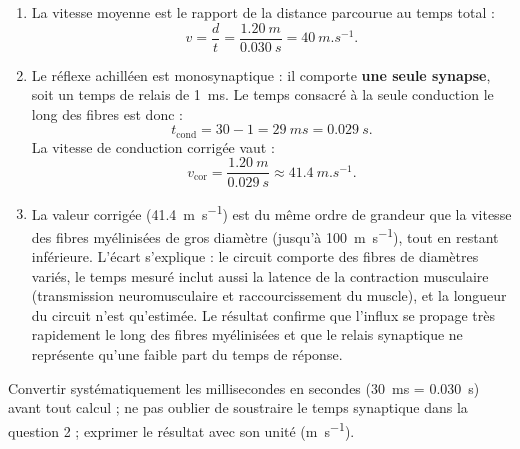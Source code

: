 \documentclass[11pt]{article}
\begin{document}
\begin{corrige}
\begin{enumerate}
\item La vitesse moyenne est le rapport de la distance parcourue au temps total :
\[ v = \frac{d}{t} = \frac{\SI{1,20}{m}}{\SI{0,030}{s}} = \SI{40}{m.s^{-1}}. \]
\item Le réflexe achilléen est monosynaptique : il comporte \textbf{une seule synapse}, soit un temps de relais de \SI{1}{ms}. Le temps consacré à la seule conduction le long des fibres est donc :
\[ t_{\text{cond}} = 30 - 1 = \SI{29}{ms} = \SI{0,029}{s}. \]
La vitesse de conduction corrigée vaut :
\[ v_{\text{cor}} = \frac{\SI{1,20}{m}}{\SI{0,029}{s}} \approx \SI{41,4}{m.s^{-1}}. \]
\item La valeur corrigée (\SI{41,4}{m.s^{-1}}) est du même ordre de grandeur que la vitesse des fibres myélinisées de gros diamètre (jusqu'à \SI{100}{m.s^{-1}}), tout en restant inférieure. L'écart s'explique : le circuit comporte des fibres de diamètres variés, le temps mesuré inclut aussi la latence de la contraction musculaire (transmission neuromusculaire et raccourcissement du muscle), et la longueur du circuit n'est qu'estimée. Le résultat confirme que l'influx se propage très rapidement le long des fibres myélinisées et que le relais synaptique ne représente qu'une faible part du temps de réponse.
\end{enumerate}
\end{corrige}

\begin{attention}
Convertir systématiquement les millisecondes en secondes (\SI{30}{ms} = \SI{0,030}{s}) avant tout calcul ; ne pas oublier de soustraire le temps synaptique dans la question 2 ; exprimer le résultat avec son unité (\si{m.s^{-1}}).
\end{attention}
\end{document}
